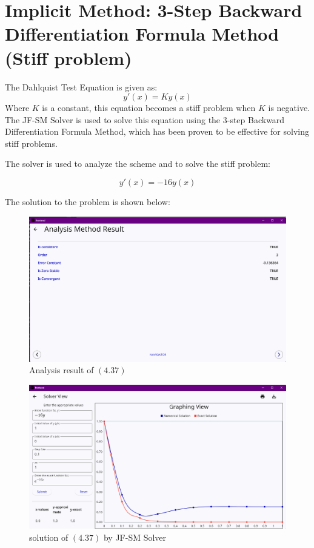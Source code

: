 \newpage

\section{Implicit Method: 3-Step Backward Differentiation Formula Method (Stiff problem)}


The Dahlquist Test Equation is given as:
\begin{equation}
    y'(x) = Ky(x)
\end{equation}
Where $K$ is a constant, this equation becomes a stiff problem when $K$ is negative. The JF-SM Solver is used to solve this equation using the 3-step Backward Differentiation Formula Method, which has been proven to be effective for solving stiff problems.

The solver is used to analyze the scheme and to solve the stiff problem:

\begin{equation}
y'(x) = -16y(x)
\end{equation}

The solution to the problem is shown below:

\begin{figure}[htbp]
    \centering
    \includegraphics[width=1\textwidth]{chapters/4/image/stiifa.png}
    \caption{Analysis result of $(4.37)$ }
\end{figure}


\begin{figure}[htbp]
    \centering
    \includegraphics[width=1\textwidth]{chapters/4/image/stiffb.png}
    \caption{solution of $(4.37)$ by JF-SM Solver}
\end{figure}

